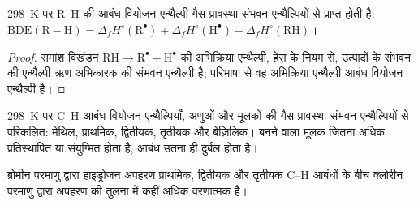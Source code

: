 \begin{proposition}[आबंध वियोजन एन्थैल्पियाँ]\label{prop:b3:radicals-carbenes:bde}
\qty{298}{K} पर R--H की आबंध वियोजन एन्थैल्पी गैस-प्रावस्था संभवन
एन्थैल्पियों से प्राप्त होती है: $\mathrm{BDE(R{-}H)} = \Delta_fH^\circ(\mathrm R^\bullet) + \Delta_fH^\circ(\mathrm H^\bullet) - \Delta_fH^\circ(\mathrm{RH})$।
\end{proposition}

\begin{proof}
समांश विखंडन $\mathrm{RH \to R^\bullet + H^\bullet}$ की अभिक्रिया एन्थैल्पी, हेस के नियम से, उत्पादों के
संभवन की एन्थैल्पी ऋण अभिकारक की संभवन एन्थैल्पी है; परिभाषा से वह अभिक्रिया एन्थैल्पी
आबंध वियोजन एन्थैल्पी है।
\end{proof}

\begin{omfigure}

{\small \qty{298}{K} पर C--H आबंध वियोजन एन्थैल्पियाँ, अणुओं और मूलकों की
गैस-प्रावस्था संभवन एन्थैल्पियों से परिकलित: मेथिल, प्राथमिक,
द्वितीयक, तृतीयक और बेंज़िलिक। बनने वाला मूलक जितना अधिक प्रतिस्थापित या संयुग्मित होता है,
आबंध उतना ही दुर्बल होता है।}
\end{omfigure}

\begin{proposition}\label{prop:b3:radicals-carbenes:halogenation-selectivity}
ब्रोमीन परमाणु द्वारा हाइड्रोजन अपहरण प्राथमिक, द्वितीयक और तृतीयक C--H
आबंधों के बीच क्लोरीन परमाणु द्वारा अपहरण की तुलना में कहीं अधिक वरणात्मक है।
\end{proposition}

